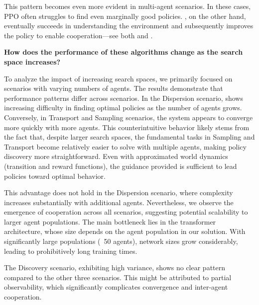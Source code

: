 This pattern becomes even more evident in multi-agent scenarios. 
In these cases, PPO often struggles to find even marginally good policies. 
\fname{}, on the other hand, eventually succeeds in understanding the environment and subsequently improves the policy to enable cooperation---see both  and .
\begin{center}
 \textbf{How does the performance of these algorithms change as the search space increases?}
\end{center}
To analyze the impact of increasing search spaces, we primarily focused on scenarios with varying numbers of agents.
The results demonstrate that performance patterns differ across scenarios.
In the Dispersion scenario, \fname{} shows increasing difficulty in finding optimal policies as the number of agents grows.
Conversely, in Transport and Sampling scenarios, the system appears to converge more quickly with more agents.
This counterintuitive behavior likely stems from the fact that, despite larger search spaces, the fundamental tasks in Sampling and Transport become relatively easier to solve with multiple agents, making policy discovery more straightforward.
Even with approximated world dynamics (transition and reward functions), the guidance provided is sufficient to lead policies toward optimal behavior.

This advantage does not hold in the Dispersion scenario, where complexity increases substantially with additional agents.
Nevertheless, we observe the emergence of cooperation across all scenarios, suggesting potential scalability to larger agent populations.
The main bottleneck lies in the transformer architecture, whose size depends on the agent population in our solution.
With significantly large populations (~50 agents), network sizes grow considerably, leading to prohibitively long training times.

The Discovery scenario, exhibiting high variance, shows no clear pattern compared to the other three scenarios.
This might be attributed to partial observability, which significantly complicates convergence and inter-agent cooperation.
